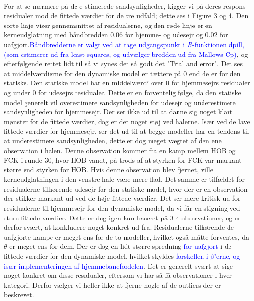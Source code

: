 \documentclass[11pt,a4paper]{article}
\begin{document}
 \\
 For at se nærmere på de e
 stimerede sandsynligheder, kigger vi på deres respons-residualer mod de fittede værdier for de tre udfald; dette ses i Figure 3 og 4. Den sorte linje viser gennemsnittet af residualerne, og den røde linje er en kerneudglatning med båndbredden 0.06 for hjemme- og udesejr og 0.02 for uafgjort.\te \textcolor{blue}{Båndbredderne er valgt ved at tage udgangspunkt i \textit{R}-funktionen {\selectfont dpill}, (som estimerer ud fra least squares, og udvælger bredden ud fra Mallows Cp)}, og efterfølgende rettet lidt til så vi synes det så godt det "Trial and error". Det ses at middelværdierne for den dynamiske model er tættere på 0 end de er for den statiske. Den statiske model har en middelværdi over 0 for hjemmesejrs residualer og under 0 for udesejrs residualer. Dette er en forventelig følge, da den statiske model generelt vil overestimere sandsynligheden for udesejr og underestimere sandsynligheden for hjemmesejr. Der ser ikke ud til at danne sig noget klart mønster for de fittede værdier, dog er der noget støj ved halerne. Især ved de lave fittede værdier for hjemmesejr, ser det ud til at begge modeller har en tendens til at underestimere sandsynligheden, dette er dog meget vægtet af den ene observation i halen. Denne observation kommer fra en kamp mellem HOB og FCK i runde 30, hvor HOB vandt, på trods af at styrken for FCK var markant større end styrken for HOB. Hvis denne observation blev fjernet, ville kerneudglatningen i den venstre hale være mere flad. Det samme er tilfældet for residualerne tilhørende udesejr for den statiske model, hvor der er en observation der stikker markant ud ved de høje fittede værdier. Det ser mere kritisk ud for residualerne til hjemmesejr for den dynamiske model, da vi får en stigning ved store fittede værdier. Dette er dog igen kun baseret på 3-4 observationer, og er derfor svært, at konkludere noget konkret ud fra. Residualerne tilhørende de uafgjorte kampe er meget ens for de to modeller, hvilket også måtte forventes, da $\theta$ er meget ens for dem. Der er dog en lidt større spredning \textcolor{blue}{for uafgjort} i de fittede værdier for den dynamiske model, hvilket skyldes \textcolor{blue}{forskellen i $\beta$'erne, og især implementeringen af hjemmebanefordelen}. Det er generelt svært at sige noget konkret om disse residualer, eftersom vi har så få observationer i hver kategori. Derfor vælger vi heller ikke at fjerne nogle af de outliers der er beskrevet.
\end{document}
